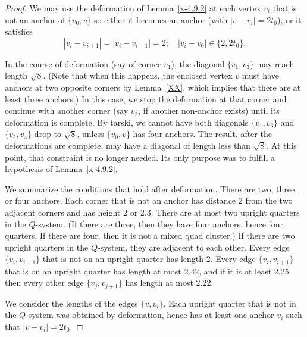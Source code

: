 \begin{proof}

We may use the deformation of Lemma~\ref{x-4.9.2}
at each vertex $v_i$ that is not an anchor of $\{v_0,v\}$ so either
it becomes an anchor (with $|v-v_i|=2t_0$), or it satisfies
  $$|v_i-v_{i+1}|=|v_i-v_{i-1}|=2;\quad |v_i-v_0|\in\{2,2t_0\}.$$ 

In the course of deformation (say of corner $v_1$),  
the diagonal $\{v_1,v_3\}$ may reach length $\sqrt8$.  
(Note that when this happens, the enclosed vertex $v$ must have anchors at two opposite corners
by Lemma~\ref{XX}, which implies that there are at least three anchors.)
In this case, we stop
the deformation at that corner and continue with another
corner (say $v_2$, if another non-anchor exists)
until its deformation
is complete.  By tarski, we cannot have both diagonals $\{v_1,v_3\}$ and $\{v_2,v_4\}$
drop to $\sqrt8$, unless $\{v_0,v\}$ has four
anchors.  The result, after the deformations are complete, may
have a diagonal of length less than $\sqrt8$.  At this point,
that constraint is no longer needed.  Its only purpose was to
fulfill a hypothesis of Lemma~\ref{x-4.9.2}.

We summarize the conditions that hold after deformation.
There are two, three, or four anchors.  Each
corner that is not an anchor has distance $2$ from the two adjacent corners
and has height $2$ or $2.3$.  There are at most two upright quarters in the
$Q$-system.  (If there are three, then they have four anchors, hence four
quarters.  If there are four, then it is not a mixed quad cluster.)  If there
are two upright quarters in the $Q$-system, they are adjacent to each other.
Every edge $\{v_i,v_{i+1}\}$ that is not on an upright quarter has length $2$.
Every edge $\{v_i,v_{i+1}\}$ that is on an upright quarter has length at most $2.42$,
and if it is at least $2.25$ then every other edge $\{v_j,v_{j+1}\}$ has length at most $2.22$.


We consider the lengths of the edges $\{v,v_i\}$.  Each upright quarter that is not in 
the $Q$-system was obtained by deformation, hence has at least one anchor $v_i$
such that $|v-v_i|=2t_0$.



\end{proof}
